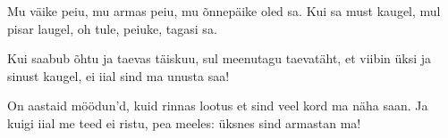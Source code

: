 Mu v\"aike peiu, mu armas peiu,
mu \~onnep\"aike oled sa.
Kui sa must kaugel, mul pisar laugel,
oh tule, peiuke, tagasi sa.

Kui saabub \~ohtu ja taevas t\"aiskuu,
sul meenutagu taevat\"aht,
et viibin \"uksi ja sinust kaugel,
ei iial sind ma unusta saa!

On aastaid m\"o\"odun'd, kuid rinnas lootus
et sind veel kord ma n\"aha saan.
Ja kuigi iial me teed ei ristu,
pea meeles: \"uksnes sind armastan ma!